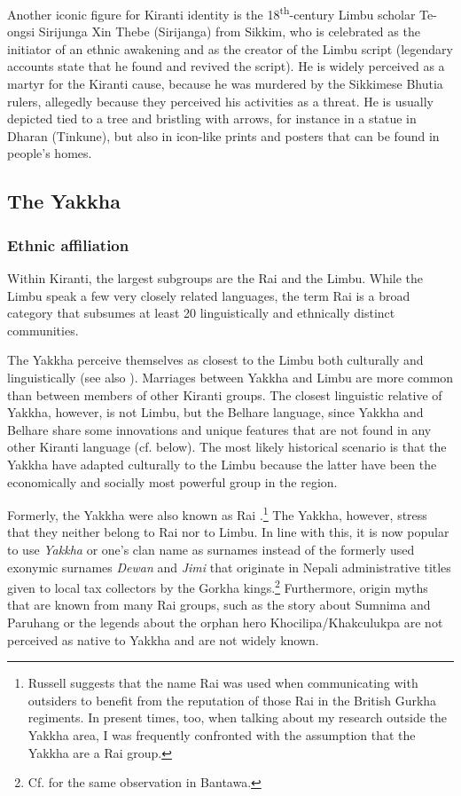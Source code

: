 Another iconic figure for Kiranti identity is the 18\textsuperscript{th}-century Limbu scholar Te-ongsi Sirijunga Xin Thebe (Sirijanga) from Sikkim, who is celebrated as the initiator of an ethnic awakening and as the creator of the Limbu script (legendary accounts state that he found and revived the script). He is widely perceived as a martyr for the Kiranti cause, because he was  murdered by the Sikkimese Bhutia rulers, allegedly because they perceived his activities as a threat. He is usually depicted tied to a tree and bristling with arrows, for instance in a statue in Dharan (Tinkune), but also in icon-like prints and posters that can be found in people's homes.


\subsection{The Yakkha}

\subsubsection{Ethnic affiliation}

Within Kiranti, the largest subgroups are the Rai and the Limbu. While the Limbu speak a few very closely related languages, the term Rai is a broad category that subsumes at least 20 linguistically and ethnically distinct communities.  

The Yakkha perceive themselves as closest to the Limbu both culturally and linguistically (see also \citet[90]{Russell1992_Yakha}). Marriages between Yakkha and Limbu are more common than between members of other Kiranti groups. The closest linguistic relative of Yakkha, however, is not Limbu, but the Belhare language, since Yakkha and Belhare share some innovations and unique features that are not found in any other Kiranti language (cf.  below). The most likely historical scenario is that the Yakkha have adapted culturally to the Limbu because the latter have been  the economically and socially most powerful group in the region. 

Formerly, the Yakkha were also known as Rai \citep[90]{Russell1992_Yakha}.\footnote{Russell suggests that the name Rai was used when communicating with outsiders to benefit from the reputation of those Rai in the British Gurkha regiments. In present times, too, when talking about my research outside the Yakkha area, I was frequently confronted with the assumption that the Yakkha are a Rai group.}  The Yakkha, however, stress that they neither belong to Rai nor to Limbu. In line with this, it is now popular to use \emph{Yakkha} or one's  clan name as surnames instead of the formerly used exonymic surnames \emph{Dewan} and \emph{Jimi} that originate in Nepali administrative titles given to local tax collectors by the Gorkha kings.\footnote{Cf. \citet[8]{Doornenbal2009A-grammar} for the same observation in Bantawa.} Furthermore,  origin myths that are known from many Rai groups, such as the story about Sumnima and Paruhang or the legends about the orphan hero Khocilipa/Khakculukpa \citep{Ebert2003Camling, Gaenszle2000Origins} are not perceived as native to Yakkha and are not widely known. 

